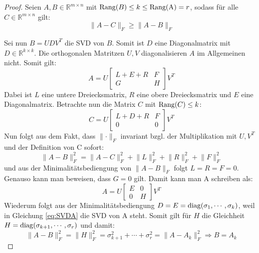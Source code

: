 \documentclass{article}
\newcommand{\R}[0]{\mathbb{R}}
\theoremstyle{plain}
\theoremstyle{definition}
\begin{document}
\begin{proof} \cite[S. 74]{strang2019linear}
    Seien $A,B \in \R^{m \times n}$ mit ${\rm Rang}(B) \leq k \leq {\rm Rang(A)} = r$, sodass für alle $C \in \R^{m \times n}$ gilt: 
    \begin{equation*}
        \lVert A - C \rVert_F \geq \lVert A - B \rVert_F
    \end{equation*}

    Sei nun $B=U D V^T$ die SVD von $B$. Somit ist $D$ eine Diagonalmatrix mit $D \in \R^{k\times k}$. 
    Die orthogonalen Matritzen $U,V$ diagonalisieren $A$ im Allgemeinen nicht. Somit gilt:
    \begin{equation*}
        A = U \begin{bmatrix}
            L+E+R & F\\
            G & H
        \end{bmatrix} V^T
    \end{equation*} 
    Dabei ist $L$ eine untere Dreiecksmatrix, $R$ eine obere Dreiecksmatrix und $E$ eine Diagonalmatrix. Betrachte nun die Matrix $C$ mit ${\rm Rang}(C) \leq k$:
    \begin{equation*}
        C = U \begin{bmatrix}
            L+D+R & F \\
            0 & 0
        \end{bmatrix} V^T
    \end{equation*}
    Nun folgt aus dem Fakt, dass $\lVert \cdot \rVert_F$ invariant bzgl. der Multiplikation mit $U, V^T$ und der Definition von C sofort:
    \begin{equation*}
        \lVert A - B \rVert_F^2 = \lVert A-C \rVert_F^2 + \lVert L \rVert_F^2 + \lVert R \rVert_F^2 + \lVert F \rVert_F^2
    \end{equation*}
    und aus der Minimalitätsbediengung von $\lVert A - B \rVert_F$ folgt $L = R = F = 0$. Genauso kann man beweisen, dass $G = 0$ gilt. Damit kann man A schreiben als:
    \begin{equation}
        A = U \begin{bmatrix}
            E & 0 \\
            0 & H
        \end{bmatrix} V^T \label{eq:SVDA}
    \end{equation}
    Wiederum folgt aus der Minimalitätsbediengung $D = E = {\rm diag}(\sigma_1, \cdots, \sigma_k)$, weil in Gleichung \ref{eq:SVDA} die SVD von A steht.
    Somit gilt für $H$ die Gleichheit $H = {\rm diag}(\sigma_{k+1}, \cdots, \sigma_r)$ und damit:
    \begin{equation*}
        \lVert A - B \rVert_F^2 = \lVert H \rVert_F^2 = \sigma_{k+1}^2 + \cdots + \sigma_{r}^2 = \lVert A - A_k \rVert_F^2 \Rightarrow B = A_k 
    \end{equation*}

\end{proof}
\end{document}
